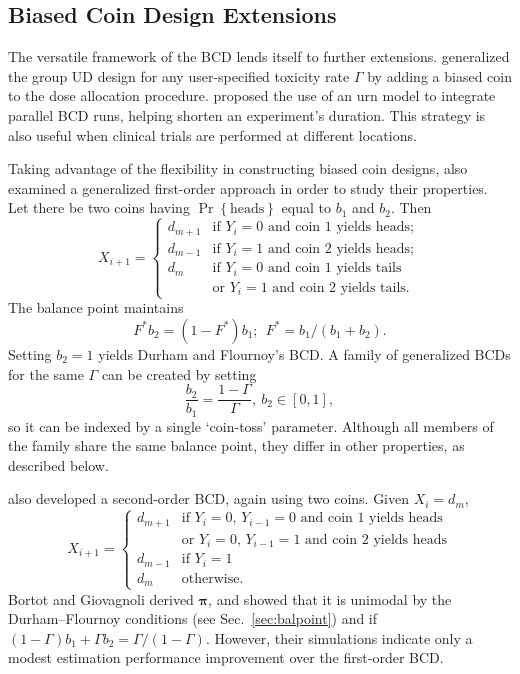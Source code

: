 \subsection{Biased Coin Design Extensions}

The versatile framework of the BCD lends itself to further extensions. \cite{Bald:Bort:Giov:2008} generalized the group UD design for any user-specified toxicity rate $\Gamma$ by adding a biased coin to the dose allocation procedure. \cite{Flou:aran:1998} proposed the use of an urn model to integrate parallel BCD runs, helping shorten an experiment's duration. This strategy is also useful when clinical trials are performed at different locations.

Taking advantage of the flexibility in constructing biased coin designs, \cite{Bort:Giov:Upan:2005} also examined a generalized first-order approach in order to study their properties. Let there be two coins having $\Pr\left\{\textrm{heads}\right\}$ equal to $b_1$ and $b_2$. Then
\begin{equation}\label{eq:BortotCombo}
X_{i+1}=
\begin{cases}
d_{m+1} &\textrm{if $Y_i=0$ and coin 1 yields heads};\\
d_{m-1} &\textrm{if $Y_i=1$ and coin 2 yields heads};\\
d_{m} &\textrm{if $Y_i=0$ and coin 1 yields tails}\\
        & \textrm{or $Y_i=1$ and coin 2 yields tails.}
\end{cases}
\end{equation}
\noindent The balance point maintains
\begin{equation*}
F^*b_2=\left(1-F^*\right)b_1;\ \ F^*=b_1/(b_1+b_2).
\end{equation*}
\noindent Setting $b_2=1$ yields Durham and Flournoy's BCD. A family of generalized BCDs for the same $\Gamma$ can be created by setting $$\frac{b_2}{b_1}=\frac{1-\Gamma}{\Gamma},\ b_2\in [0,1],$$ so it can be indexed by a single `coin-toss' parameter. Although all members of the family share the same balance point, they differ in other properties, as described below.

\cite{Bort:Giov:Upan:2005} also developed a second-order BCD, again using two coins. Given $X_i=d_m$,
%
\begin{equation*}
X_{i+1}=
\begin{cases}
d_{m+1} &\textrm{if $Y_i=0$, $Y_{i-1}=0$ and coin 1 yields heads}\\
        &\textrm{or $Y_i=0$, $Y_{i-1}=1$ and coin 2 yields heads}\\
d_{m-1} &\textrm{if $Y_i=1$}\\
d_m &\textrm{otherwise.}
\end{cases}
\end{equation*}
%
Bortot and Giovagnoli derived $\boldsymbol{\pi}$, and showed that it is unimodal by the Durham--Flournoy conditions (see Sec.~\ref{sec:balpoint}) and if $(1-\Gamma )b_1+\Gamma b_2=\Gamma /(1-\Gamma )$. However, their simulations indicate only a modest estimation performance improvement over the first-order BCD.

